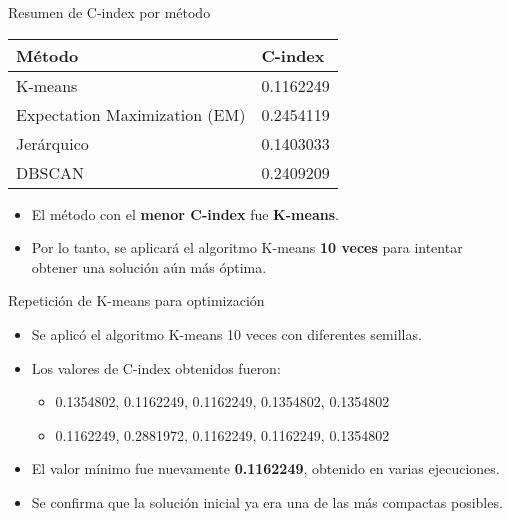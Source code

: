 \documentclass[
	11pt, %
]{beamer}
\begin{document}
\begin{frame}{Resumen de C-index por método}
\begin{center}
\begin{tabular}{ll}
\toprule
\textbf{Método} & \textbf{C-index} \\
\midrule
K-means & 0.1162249 \\
Expectation Maximization (EM) & 0.2454119 \\
Jerárquico & 0.1403033 \\
DBSCAN & 0.2409209 \\
\bottomrule
\end{tabular}
\end{center}
\vspace{0.5cm}
\begin{itemize}
    \item El método con el \textbf{menor C-index} fue \textbf{K-means}.
    \item Por lo tanto, se aplicará el algoritmo K-means \textbf{10 veces} para intentar obtener una solución aún más óptima.
\end{itemize}
\end{frame}

\begin{frame}{Repetición de K-means para optimización}
\begin{itemize}
    \item Se aplicó el algoritmo K-means 10 veces con diferentes semillas.
    \item Los valores de C-index obtenidos fueron:
    \begin{itemize}
        \item 0.1354802, 0.1162249, 0.1162249, 0.1354802, 0.1354802
        \item 0.1162249, 0.2881972, 0.1162249, 0.1162249, 0.1354802
    \end{itemize}
    \item El valor mínimo fue nuevamente \textbf{0.1162249}, obtenido en varias ejecuciones.
    \item Se confirma que la solución inicial ya era una de las más compactas posibles.
\end{itemize}
\end{frame}
\end{document}
